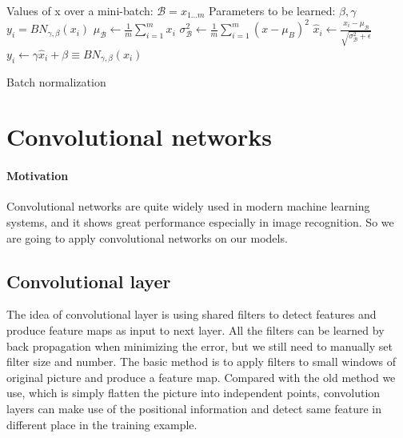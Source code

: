 \documentclass{article}
\begin{document}
\begin{algorithm}[ht]
\begin{algorithmic}
    Values of x over a mini-batch: $\mathcal{B} = {x_{1...m}}$
    Parameters to be learned: $\beta, \gamma$ 
    $y_i = BN_{\gamma,\beta}(x_i)$ 
   \STATE $\mu_{\mathcal{B}} \gets \frac{1}{m} \sum\limits_{i=1}^{m} x_i$
   \STATE $ \sigma^2_{\mathcal{B}} \gets \frac{1}{m} \sum\limits_{i=1}^{m} (x- \mu_B)^2 $
   \STATE $ \hat x_i \gets \frac{x_i-\mu_\mathcal{B}}{\sqrt{\sigma^2_{\mathcal{B}}+\epsilon}} $
   \STATE $ y_i  \gets \gamma \hat x_i + \beta \equiv  BN_{\gamma,\beta}(x_i) $
   
\end{algorithmic}
  \caption{Batch normalization }
  \label{alg:batchnorm}
\end{algorithm}






\section{Convolutional networks}

\paragraph{Motivation}
Convolutional networks are quite widely used in modern machine learning systems, and it shows great performance especially in image recognition. So we are going to apply convolutional networks on our models.
 
\subsection{Convolutional layer}

The idea of convolutional layer is using shared filters to detect features and produce feature maps as input to next layer. All the filters can be learned by back propagation when minimizing the error, but we still need to manually set filter size and number. The basic method is to apply filters to small windows of original picture and produce a feature map. Compared with the old method we use, which is simply flatten the picture into independent points, convolution layers can make use of the positional information and detect same feature in different place in the training example.
\end{document}
